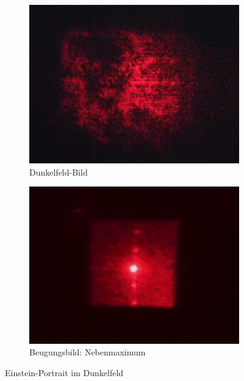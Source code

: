 \begin{figure}[p]
	\centering
	\begin{subfigure}{0.49\textwidth}
		\includegraphics[width=\textwidth]{data/optics/06_Einstein_Dunkel_Bild}
		\caption{Dunkelfeld-Bild}				 \label{fig:Einstein_dunkel_B}
	\end{subfigure}
	\begin{subfigure}{0.49\textwidth}
		\includegraphics[width=\textwidth]{data/optics/06_Einstein_Dunkel_Beugung}
		\caption{Beugungsbild: Nebenmaximum}	 \label{fig:Einstein_dunkel_BG}
	\end{subfigure}
	\caption{Einstein-Portrait im Dunkelfeld}		\label{fig:Einstein_dunkel}
	\vspace{-5em}
\end{figure}




